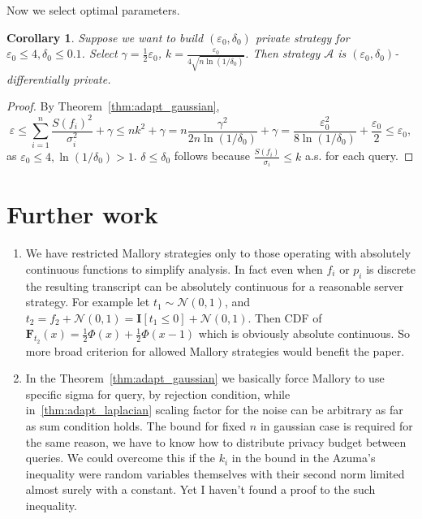 \documentclass[12pt,letterpaper]{article}
\let\eps\varepsilon
\newtheorem{corollary}{Corollary}
\newcommand{\No}{\mathcal{N}}
\begin{document}
Now we select optimal parameters.
\begin{corollary}
  Suppose we want to build $(\eps_0, \delta_0)$ private strategy for $\eps_0 \leq 4, \delta_0 \leq 0.1$. Select $\gamma = \frac{1}{2}\eps_0$, $k = \frac{\eps_0}{4\sqrt{n \ln (1/\delta_0)}}$. Then strategy $\mathcal{A}$ is $(\eps_0, \delta_0)$-differentially private.
\end{corollary}
\begin{proof}
  By Theorem~\ref{thm:adapt_gaussian},
$$\eps \leq \sum_{i=1}^{n}\frac{S(f_i)^2}{\sigma_i^2} + \gamma \leq nk^2 + \gamma = 
n\frac{\gamma^2}{2n\ln(1/\delta_0)} + \gamma = \frac{\eps_0^2}{8\ln(1/\delta_0)} + \frac{\eps_0}{2} \leq \eps_0,$$
as $\eps_0 \leq 4, \ln(1/\delta_0) > 1$.
$\delta \leq \delta_0$ follows because $\frac{S(f_i)}{\sigma_i} \leq k$ a.s. for each query.
\end{proof}

\section{Further work}
\begin{enumerate}
  \item We have restricted Mallory strategies only to those operating with absolutely continuous functions to simplify analysis. In fact even when $f_i$ or $p_i$ is discrete the resulting transcript can be absolutely continuous for a reasonable server strategy. For example let $t_1 \sim \No(0, 1)$, and $t_2 = f_2 + \No(0, 1) = \mathbf{I}[t_1 \leq 0] + \No(0, 1)$. Then CDF of $\mathbf{F}_{t_2}(x) = \frac{1}{2}\Phi(x) + \frac{1}{2}\Phi(x - 1)$ which is obviously absolute continuous. So more broad criterion for allowed Mallory strategies would benefit the paper.
  \item In the Theorem~\ref{thm:adapt_gaussian} we basically force Mallory to use specific sigma for query, by rejection condition, while in~\ref{thm:adapt_laplacian} scaling factor for the noise can be arbitrary as far as sum condition holds. The bound for fixed $n$ in gaussian case is required for the same reason, we have to know how to distribute privacy budget between queries. We could overcome this if the $k_i$ in the bound in the Azuma's inequality were random variables themselves with their second norm limited almost surely with a constant. Yet I haven't found a proof to the such inequality.
\end{enumerate}


\end{document}
